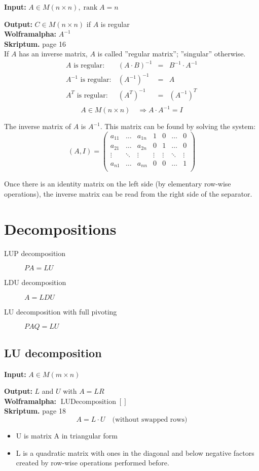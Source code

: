 \documentclass[a4paper,twocolumn]{article}
\DeclareMathOperator{\rank}{rank}
\newcommand{\io}[2]{{\par\noindent\textbf{Input:} #1 \\}{\textbf{Output:} #2 \\}}
\newcommand{\wa}[1]{\textbf{Wolframalpha:} $#1$ \\}
\newcommand{\scriptref}[1]{\textbf{Skriptum.} page #1 \\}
\begin{document}
\io{$A \in M(n\times n), \rank{A} = n$}{$C \in M(n\times n)$ if $A$ is regular}
\wa{A^{-1}}
\scriptref{16}

If $A$ has an inverse matrix, $A$ is called ''regular matrix'';
''singular'' otherwise.
%
\[
  \begin{array}{lrcl}
    A\text{ is regular}: & (A \cdot B)^{-1} &=& B^{-1} \cdot A^{-1} \\
    A^{-1}\text{ is regular}: & (A^{-1})^{-1} &=& A \\
    A^T\text{ is regular}: & (A^T)^{-1} &=& (A^{-1})^T \\
  \end{array}
\]
%
\[
    A \in M(n\times n) \quad \Rightarrow A\cdot A^{-1} = I
\]

The inverse matrix of $A$ is $A^{-1}$. This matrix can be found by
solving the system:
%
\[
    (A, I) = \left( \begin{array}{ccc|cccc}
        a_{11} & \ldots & a_{1n} & 1 & 0 & \ldots & 0 \\
        a_{21} & \ldots & a_{2n} & 0 & 1 & \ldots & 0 \\
        \vdots & \ddots & \vdots & \vdots & \vdots & \ddots & \vdots \\
        a_{n1} & \ldots & a_{nn} & 0 & 0 & \ldots & 1 \\
    \end{array} \right)
\]

Once there is an identity matrix on the left side (by elementary row-wise
operations), the inverse matrix can be read from the right side of the
separator.

\section{Decompositions}

\begin{description}
  \item[LUP decomposition]
    $
        PA = LU
    $
  \item[LDU decomposition]
    $
        A = LDU
    $
  \item[LU decomposition with full pivoting]
    $
        PAQ = LU
    $
\end{description}

\subsection{LU decomposition}

\io{$A \in M(m\times n)$}{$L$ and $U$ with $A=LR$}
\wa{\operatorname{LUDecomposition}[]}
\scriptref{18}
%
\[
    A = L \cdot U
    \quad\text{(without swapped rows)}
\]
%
\begin{itemize}
  \item U is matrix A in triangular form
  \item L is a quadratic matrix with ones in the diagonal and below
        negative factors created by row-wise operations performed before.
\end{itemize}
\end{document}
